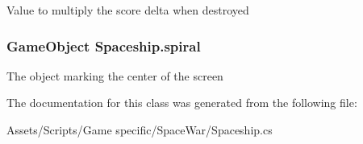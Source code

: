 Value to multiply the score delta when destroyed 

\hypertarget{class_spaceship_adbf95f3b338830d88ec225679d253ebb}{
\subsubsection[{spiral}]{\setlength{\rightskip}{0pt plus 5cm}Game\-Object Spaceship.\-spiral\hspace{0.3cm}{\ttfamily [protected]}}}\label{class_spaceship_adbf95f3b338830d88ec225679d253ebb}


The object marking the center of the screen 



The documentation for this class was generated from the following file\-:\begin{DoxyCompactItemize}
\item 
Assets/\-Scripts/\-Game specific/\-Space\-War/Spaceship.\-cs\end{DoxyCompactItemize}
